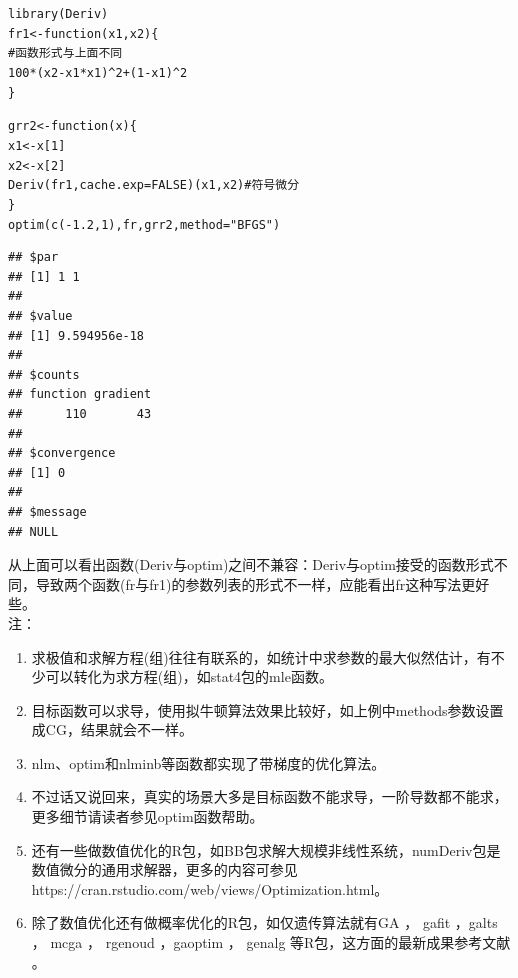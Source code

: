 \documentclass[a4paper]{ctexart}\usepackage[]{graphicx}\usepackage[]{color}
\makeatletter
\newcommand{\hlnum}[1]{\textcolor[rgb]{0.502,0.086,1}{#1}}%
\newcommand{\hlstr}[1]{\textcolor[rgb]{1,0.4,0.2}{#1}}%
\newcommand{\hlcom}[1]{\textcolor[rgb]{1,0.251,0.502}{#1}}%
\newcommand{\hlopt}[1]{\textcolor[rgb]{0.251,0.251,0.251}{#1}}%
\newcommand{\hlstd}[1]{\textcolor[rgb]{0.251,0.251,0.251}{#1}}%
\newcommand{\hlkwa}[1]{\textcolor[rgb]{0.941,0.188,0.816}{#1}}%
\newcommand{\hlkwb}[1]{\textcolor[rgb]{0,0.439,0.902}{#1}}%
\newcommand{\hlkwc}[1]{\textcolor[rgb]{0.188,0.941,0.314}{#1}}%
\newcommand{\hlkwd}[1]{\textcolor[rgb]{0.69,0.188,0.941}{#1}}%
\newenvironment{kframe}{%
 \def\at@end@of@kframe{}%
 \ifinner\ifhmode%
  \def\at@end@of@kframe{\end{minipage}}%
  \begin{minipage}{\columnwidth}%
 \fi\fi%
 \def\FrameCommand##1{\hskip\@totalleftmargin \hskip-\fboxsep
 \colorbox{shadecolor}{##1}\hskip-\fboxsep
     \hskip-\linewidth \hskip-\@totalleftmargin \hskip\columnwidth}%
 \MakeFramed {\advance\hsize-\width
   \@totalleftmargin\z@ \linewidth\hsize
   \@setminipage}}%
 {\par\unskip\endMakeFramed%
 \at@end@of@kframe}
\newenvironment{knitrout}{}{} %
\makeatother
\begin{document}
\begin{knitrout}
\color{fgcolor}\begin{kframe}
\begin{alltt}
\hlkwd{library}\hlstd{(Deriv)}
\hlstd{fr1} \hlkwb{<-} \hlkwa{function}\hlstd{(}\hlkwc{x1}\hlstd{,} \hlkwc{x2}\hlstd{) \{}
    \hlcom{# 函数形式与上面不同}
    \hlnum{100} \hlopt{*} \hlstd{(x2} \hlopt{-} \hlstd{x1} \hlopt{*} \hlstd{x1)}\hlopt{^}\hlnum{2} \hlopt{+} \hlstd{(}\hlnum{1} \hlopt{-} \hlstd{x1)}\hlopt{^}\hlnum{2}
\hlstd{\}}

\hlstd{grr2} \hlkwb{<-} \hlkwa{function}\hlstd{(}\hlkwc{x}\hlstd{) \{}
    \hlstd{x1} \hlkwb{<-} \hlstd{x[}\hlnum{1}\hlstd{]}
    \hlstd{x2} \hlkwb{<-} \hlstd{x[}\hlnum{2}\hlstd{]}
    \hlkwd{Deriv}\hlstd{(fr1,} \hlkwc{cache.exp} \hlstd{=} \hlnum{FALSE}\hlstd{)(x1, x2)}  \hlcom{# 符号微分}
\hlstd{\}}
\hlkwd{optim}\hlstd{(}\hlkwd{c}\hlstd{(}\hlopt{-}\hlnum{1.2}\hlstd{,} \hlnum{1}\hlstd{), fr, grr2,} \hlkwc{method} \hlstd{=} \hlstr{"BFGS"}\hlstd{)}
\end{alltt}
\begin{verbatim}
## $par
## [1] 1 1
## 
## $value
## [1] 9.594956e-18
## 
## $counts
## function gradient 
##      110       43 
## 
## $convergence
## [1] 0
## 
## $message
## NULL
\end{verbatim}
\end{kframe}
\end{knitrout}
从上面可以看出函数(Deriv与optim)之间不兼容：Deriv与optim接受的函数形式不同，导致两个函数(fr与fr1)的参数列表的形式不一样，应能看出fr这种写法更好些。
\\
注：
\begin{enumerate}
  \item 求极值和求解方程(组)往往有联系的，如统计中求参数的最大似然估计，有不少可以转化为求方程(组)，如stat4包\cite{R-core}的mle函数。  
  \item 目标函数可以求导，使用拟牛顿算法效果比较好，如上例中methods参数设置成CG，结果就会不一样。
  \item nlm、optim和nlminb等函数都实现了带梯度的优化算法。
  \item 不过话又说回来，真实的场景大多是目标函数不能求导，一阶导数都不能求，更多细节请读者参见optim函数帮助。
  \item 还有一些做数值优化的R包，如BB包\cite{BB}求解大规模非线性系统，numDeriv包是数值微分的通用求解器，更多的内容可参见https://cran.rstudio.com/web/views/Optimization.html。
  \item 除了数值优化还有做概率优化的R包，如仅遗传算法就有GA \cite{R-GA}， gafit \cite{R-gafit}，galts \cite{R-galts}， mcga \cite{R-mcga}， rgenoud \cite{R-rgenoud}，gaoptim \cite{R-gaoptim}， genalg \cite{R-genalg}等R包，这方面的最新成果参考文献 \cite{2016arXiv160501931S}。
\end{enumerate}
\end{document}
